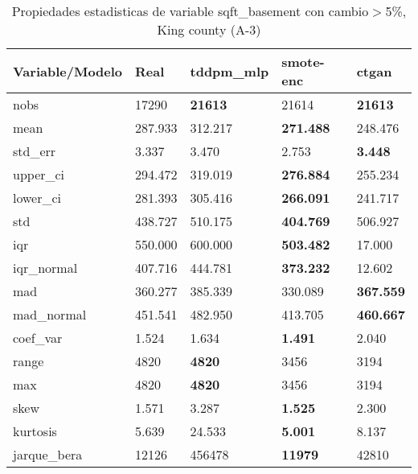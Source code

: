 \begin{table}[H]
\centering
\fontsize{8}{14}\selectfont
\caption{Propiedades estadisticas de variable sqft\_basement con cambio\ensuremath{>}5\%, King county (A-3)}
\label{table-stats-king county-a-3-sqft_basement-short}
\begin{tabular}{|l|m{10em}|m{10em}|m{10em}|m{10em}|}
\hline
 \rowcolor[gray]{0.8}
Variable/Modelo & Real & tddpm\_mlp & smote-enc & ctgan \\
\hline nobs & 17290 & \bfseries 21613 & \cellcolor[rgb]{0.9, 0.54, 0.52} 21614 & \bfseries 21613 \\
\hline mean & 287.933 & 312.217 & \bfseries 271.488 & \cellcolor[rgb]{0.9, 0.54, 0.52} 248.476 \\
\hline std\_err & 3.337 & 3.470 & \cellcolor[rgb]{0.9, 0.54, 0.52} 2.753 & \bfseries 3.448 \\
\hline upper\_ci & 294.472 & 319.019 & \bfseries 276.884 & \cellcolor[rgb]{0.9, 0.54, 0.52} 255.234 \\
\hline lower\_ci & 281.393 & 305.416 & \bfseries 266.091 & \cellcolor[rgb]{0.9, 0.54, 0.52} 241.717 \\
\hline std & 438.727 & \cellcolor[rgb]{0.9, 0.54, 0.52} 510.175 & \bfseries 404.769 & 506.927 \\
\hline iqr & 550.000 & 600.000 & \bfseries 503.482 & \cellcolor[rgb]{0.9, 0.54, 0.52} 17.000 \\
\hline iqr\_normal & 407.716 & 444.781 & \bfseries 373.232 & \cellcolor[rgb]{0.9, 0.54, 0.52} 12.602 \\
\hline mad & 360.277 & 385.339 & \cellcolor[rgb]{0.9, 0.54, 0.52} 330.089 & \bfseries 367.559 \\
\hline mad\_normal & 451.541 & 482.950 & \cellcolor[rgb]{0.9, 0.54, 0.52} 413.705 & \bfseries 460.667 \\
\hline coef\_var & 1.524 & 1.634 & \bfseries 1.491 & \cellcolor[rgb]{0.9, 0.54, 0.52} 2.040 \\
\hline range & 4820 & \bfseries 4820 & 3456 & \cellcolor[rgb]{0.9, 0.54, 0.52} 3194 \\
\hline max & 4820 & \bfseries 4820 & 3456 & \cellcolor[rgb]{0.9, 0.54, 0.52} 3194 \\
\hline skew & 1.571 & \cellcolor[rgb]{0.9, 0.54, 0.52} 3.287 & \bfseries 1.525 & 2.300 \\
\hline kurtosis & 5.639 & \cellcolor[rgb]{0.9, 0.54, 0.52} 24.533 & \bfseries 5.001 & 8.137 \\
\hline jarque\_bera & 12126 & \cellcolor[rgb]{0.9, 0.54, 0.52} 456478 & \bfseries 11979 & 42810 \\

\end{tabular}
\end{table}
